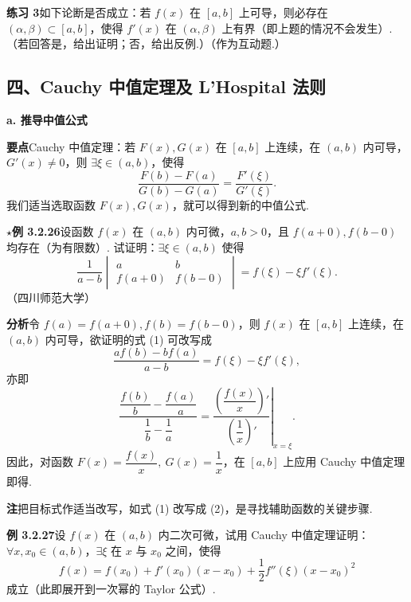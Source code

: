 \documentclass[UTF8,12pt,a4paper,fontset=fandol]{ctexart}
\begin{document}
\noindent\textbf{练习 3}\quad 如下论断是否成立：若 $f(x)$ 在 $[a,b]$ 上可导，则必存在 $(\alpha,\beta)\subset[a,b]$，使得 $f'(x)$ 在 $(\alpha,\beta)$ 上有界（即上题的情况不会发生）.（若回答是，给出证明；否，给出反例.）（作为互动题.）

\subsection*{四、Cauchy 中值定理及 L'Hospital 法则}

\noindent\textbf{a. 推导中值公式}

\noindent\textbf{要点}\quad Cauchy 中值定理：若 $F(x),G(x)$ 在 $[a,b]$ 上连续，在 $(a,b)$ 内可导，$G'(x)\ne0$，则 $\exists\xi\in(a,b)$，使得
\[
  \frac{F(b)-F(a)}{G(b)-G(a)}=\frac{F'(\xi)}{G'(\xi)}.
\]
我们适当选取函数 $F(x),G(x)$，就可以得到新的中值公式.

\noindent\textbf{$\star$例 3.2.26}\quad 设函数 $f(x)$ 在 $(a,b)$ 内可微，$a,b>0$，且 $f(a+0),f(b-0)$ 均存在（为有限数）. 试证明：$\exists\xi\in(a,b)$ 使得
\begin{equation}
  \frac1{a-b}
  \begin{vmatrix}
  a&b\\
  f(a+0)&f(b-0)
  \end{vmatrix}
  =f(\xi)-\xi f'(\xi).
\tag{1}
\end{equation}
（四川师范大学）

\noindent\textbf{分析}\quad 令 $f(a)=f(a+0),f(b)=f(b-0)$，则 $f(x)$ 在 $[a,b]$ 上连续，在 $(a,b)$ 内可导，欲证明的式 (1) 可改写成
\[
  \frac{af(b)-bf(a)}{a-b}=f(\xi)-\xi f'(\xi),
\]
亦即
\begin{equation}
  \frac{\dfrac{f(b)}b-\dfrac{f(a)}a}{\dfrac1b-\dfrac1a}
  =
  \left.\frac{\left(\dfrac{f(x)}x\right)'}{\left(\dfrac1x\right)'}\right|_{x=\xi}.
\tag{2}
\end{equation}
因此，对函数 $F(x)=\dfrac{f(x)}x,\ G(x)=\dfrac1x$，在 $[a,b]$ 上应用 Cauchy 中值定理即得.

\noindent\textbf{注}\quad 把目标式作适当改写，如式 (1) 改写成 (2)，是寻找辅助函数的关键步骤.

\noindent\textbf{例 3.2.27}\quad 设 $f(x)$ 在 $(a,b)$ 内二次可微，试用 Cauchy 中值定理证明：$\forall x,x_0\in(a,b)$，$\exists\xi$ 在 $x$ 与 $x_0$ 之间，使得
\begin{equation}
  f(x)=f(x_0)+f'(x_0)(x-x_0)+\frac12f''(\xi)(x-x_0)^2
\tag{1}
\end{equation}
成立（此即展开到一次幂的 Taylor 公式）.
\end{document}
